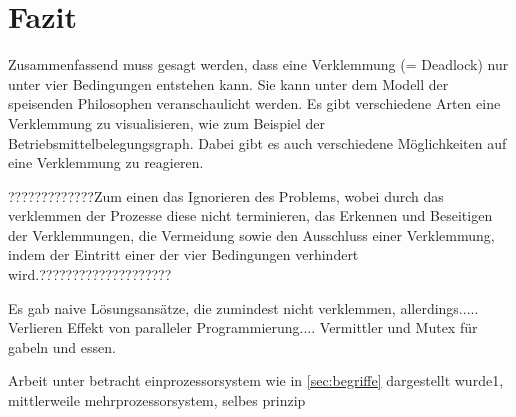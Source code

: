 \chapter{Fazit}
\label{fazit}

Zusammenfassend muss gesagt werden, dass eine Verklemmung (= Deadlock) nur unter vier Bedingungen entstehen kann. Sie kann unter dem Modell der speisenden Philosophen veranschaulicht werden. Es gibt verschiedene Arten eine Verklemmung zu visualisieren, wie zum Beispiel der Betriebsmittelbelegungsgraph. Dabei gibt es auch verschiedene Möglichkeiten auf eine Verklemmung zu reagieren. 

?????????????Zum einen das Ignorieren des Problems, wobei durch das verklemmen der Prozesse diese nicht terminieren, das Erkennen und Beseitigen der Verklemmungen, die Vermeidung sowie den Ausschluss einer Verklemmung, indem der Eintritt einer der vier Bedingungen verhindert wird.????????????????????

Es gab naive Lösungsansätze, die zumindest nicht verklemmen, allerdings..... Verlieren Effekt von paralleler Programmierung.... Vermittler und Mutex für gabeln und essen.

Arbeit unter betracht einprozessorsystem wie in \ref{sec:begriffe}   dargestellt wurde1, mittlerweile mehrprozessorsystem, selbes prinzip